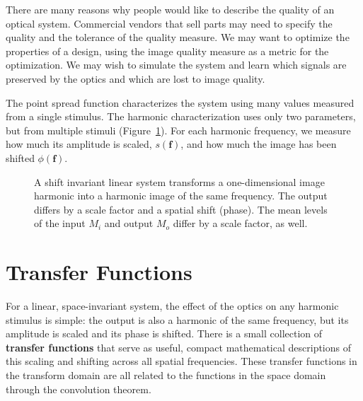 \documentclass[
  letterpaper,
]{book}
\begin{document}
There are many reasons why people would like to describe the quality of
an optical system. Commercial vendors that sell parts may need to
specify the quality and the tolerance of the quality measure. We may
want to optimize the properties of a design, using the image quality
measure as a metric for the optimization. We may wish to simulate the
system and learn which signals are preserved by the optics and which are
lost to image quality.

The point spread function characterizes the system using many values
measured from a single stimulus. The harmonic characterization uses only
two parameters, but from multiple stimuli
(Figure~\ref{fig-optics-harmonic-eigen}). For each harmonic frequency,
we measure how much its amplitude is scaled, \(s(\mathbf{f})\), and how
much the image has been shifted \(\phi(\mathbf{f})\).

\begin{figure}


\caption{\label{fig-optics-harmonic-eigen}A shift invariant linear
system transforms a one-dimensional image harmonic into a harmonic image
of the same frequency. The output differs by a scale factor and a
spatial shift (phase). The mean levels of the input \(M_i\) and output
\(M_o\) differ by a scale factor, as well.}

\end{figure}%

\section{Transfer Functions}\label{sec-optics-transfer-function}

For a linear, space-invariant system, the effect of the optics on any
harmonic stimulus is simple: the output is also a harmonic of the same
frequency, but its amplitude is scaled and its phase is shifted. There
is a small collection of \textbf{transfer functions} that serve as
useful, compact mathematical descriptions of this scaling and shifting
across all spatial frequencies. These transfer functions in the
transform domain are all related to the functions in the space domain
through the convolution theorem.
\end{document}
